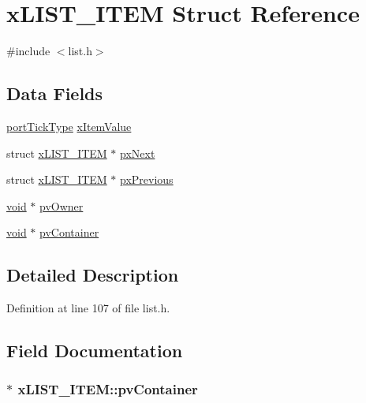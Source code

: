 \hypertarget{structx_l_i_s_t___i_t_e_m}{\section{x\-L\-I\-S\-T\-\_\-\-I\-T\-E\-M Struct Reference}
\label{structx_l_i_s_t___i_t_e_m}
}


{\ttfamily \#include $<$list.\-h$>$}

\subsection*{Data Fields}
\begin{DoxyCompactItemize}
\item 
\hyperlink{_s_t_m32_f10x_2_libraries_2_free_r_t_o_s_2_source_2portable_2_g_c_c_2_a_r_m___c_m3_2portmacro_8h_a4d746b2ff8fafc490b764c66411ec457}{port\-Tick\-Type} \hyperlink{structx_l_i_s_t___i_t_e_m_ae405228a5af48347ce8e99d75a3e7f72}{x\-Item\-Value}
\item 
struct \hyperlink{structx_l_i_s_t___i_t_e_m}{x\-L\-I\-S\-T\-\_\-\-I\-T\-E\-M} $\ast$ \hyperlink{structx_l_i_s_t___i_t_e_m_a20d5193f97c0b4a97ed4d775c9f426c2}{px\-Next}
\item 
struct \hyperlink{structx_l_i_s_t___i_t_e_m}{x\-L\-I\-S\-T\-\_\-\-I\-T\-E\-M} $\ast$ \hyperlink{structx_l_i_s_t___i_t_e_m_aeda74c3938147a5f1a26711733298c45}{px\-Previous}
\item 
\hyperlink{group___n_a_m_e_ga18028b8badbf1ea7e704ccac3c488e82}{void} $\ast$ \hyperlink{structx_l_i_s_t___i_t_e_m_ae639b0b2b1b9da88a3751b2a28251762}{pv\-Owner}
\item 
\hyperlink{group___n_a_m_e_ga18028b8badbf1ea7e704ccac3c488e82}{void} $\ast$ \hyperlink{structx_l_i_s_t___i_t_e_m_a77ad6c8a0e2b7c7dc08be3c98853b265}{pv\-Container}
\end{DoxyCompactItemize}


\subsection{Detailed Description}


Definition at line 107 of file list.\-h.



\subsection{Field Documentation}
\hypertarget{structx_l_i_s_t___i_t_e_m_a77ad6c8a0e2b7c7dc08be3c98853b265}{
\subsubsection[{pv\-Container}]{ $\ast$ x\-L\-I\-S\-T\-\_\-\-I\-T\-E\-M\-::pv\-Container}}\label{structx_l_i_s_t___i_t_e_m_a77ad6c8a0e2b7c7dc08be3c98853b265}


